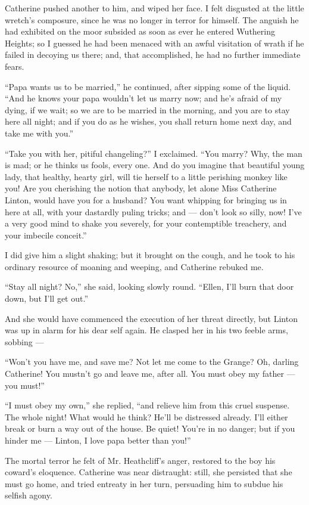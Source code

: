 \par Catherine pushed another to him, and wiped her face. I felt disgusted at the little wretch's composure, since he was no longer in terror for himself. The anguish he had exhibited on the moor subsided as soon as ever he entered Wuthering Heights; so I guessed he had been menaced with an awful visitation of wrath if he failed in decoying us there; and, that accomplished, he had no further immediate fears.
\par “Papa wants us to be married,” he continued, after sipping some of the liquid. “And he knows your papa wouldn't let us marry now; and he's afraid of my dying, if we wait; so we are to be married in the morning, and you are to stay here all night; and if you do as he wishes, you shall return home next day, and take me with you.”
\par “Take you with her, pitiful changeling?” I exclaimed. “You marry? Why, the man is mad; or he thinks us fools, every one. And do you imagine that beautiful young lady, that healthy, hearty girl, will tie herself to a little perishing monkey like you! Are you cherishing the notion that anybody, let alone Miss Catherine Linton, would have you for a husband? You want whipping for bringing us in here at all, with your dastardly puling tricks; and — don't look so silly, now! I've a very good mind to shake you severely, for your contemptible treachery, and your imbecile conceit.”
\par I did give him a slight shaking; but it brought on the cough, and he took to his ordinary resource of moaning and weeping, and Catherine rebuked me.
\par “Stay all night? No,” she said, looking slowly round. “Ellen, I'll burn that door down, but I'll get out.”
\par And she would have commenced the execution of her threat directly, but Linton was up in alarm for his dear self again. He clasped her in his two feeble arms, sobbing —
\par “Won't you have me, and save me? Not let me come to the Grange? Oh, darling Catherine! You mustn't go and leave me, after all. You must obey my father — you must!”
\par “I must obey my own,” she replied, “and relieve him from this cruel suspense. The whole night! What would he think? He'll be distressed already. I'll either break or burn a way out of the house. Be quiet! You're in no danger; but if you hinder me — Linton, I love papa better than you!”
\par The mortal terror he felt of Mr. Heathcliff's anger, restored to the boy his coward's eloquence. Catherine was near distraught: still, she persisted that she must go home, and tried entreaty in her turn, persuading him to subdue his selfish agony.
